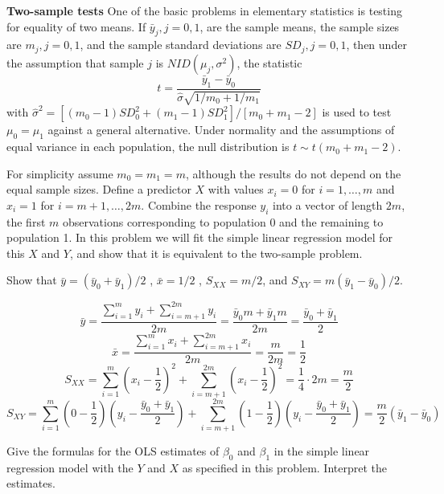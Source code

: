 \documentclass[12pt,oneside,a4paper]{article}\usepackage[]{graphicx}\usepackage[]{xcolor}
\newenvironment{problem}[2][Problem]{\begin{trivlist}
\item[\hskip \labelsep {\bfseries #1}\hskip \labelsep {\bfseries #2.}]}{\end{trivlist}}
\begin{document}
\begin{problem}{2.10}
\textbf{Two-sample tests} One of the basic problems in elementary statistics is testing for equality of two means. If $\bar{y}_{j}, j = 0,1$, are the sample means, the sample sizes are $m_{j} , j = 0, 1$, and the sample standard deviations are $SD_{j}, j  =  0, 1$, then under the assumption that sample $j$ is $NID(\mu_{j}, \sigma^{2})$, the statistic 
$$t =\frac{\bar{y}_{1} - \bar{y}_{0}}{\hat{\sigma}\sqrt{1/m_{0} + 1/m_{1}} }$$
with $\hat{\sigma}^{2} = [( m_{0} - 1 ) SD_{0}^{2} + ( m_{1} - 1 ) SD_{1}^{2} ] / [ m_0 + m_1 - 2 ]$ is used to test $\mu_{0} = \mu_{1}$ against a general alternative. Under normality and the assumptions of equal variance in each population, the null distribution is $t \sim t(m_{0}+m_{1}-2)$.

For simplicity assume $m_{0} = m_{1} = m$, although the results do not depend on the equal sample sizes. Define a predictor $X$ with values $x_{i} = 0$ for $i = 1,\dots,m$ and $x_{i} = 1$ for $i = m+1,\dots,2m$. Combine the response $y_{i}$ into a vector of length $2m$, the first $m$ observations corresponding to population 0 and the remaining to population 1. In this problem we will fit the simple linear regression model for this $X$ and $Y$, and show that it is equivalent to the two-sample problem.
\end{problem}

\begin{problem}{2.10.1}
Show that $\bar{y} = ( \bar{y}_{0} + \bar{y}_{1} ) / 2$ , $\bar{x} = 1 / 2$ , $S_{XX}  =  m/2$, and $S_{XY} = m ( \bar{y}_1-\bar{y}_0 ) / 2$.
\end{problem}

$$\bar{y} = \frac{\sum_{i = 1}^{m}{y_{i}} + \sum_{i=m+1}^{2m}{y_{i}}}{2m} = \frac{\bar{y}_{0}m + \bar{y}_{1}m}{2m} = \frac{\bar{y}_{0} + \bar{y}_{1}}{2}$$
$$\bar{x} = \frac{\sum_{i = 1}^{m}{x_{i}} + \sum_{i=m+1}^{2m}{x_{i}}}{2m} = \frac{m}{2m} = \frac{1}{2}$$
$$S_{XX} = \sum_{i = 1}^{m}{(x_{i} - \frac{1}{2})^2} + \sum_{i=m+1}^{2m}{(x_{i} - \frac{1}{2})^2} = \frac{1}{4}\cdot 2m = \frac{m}{2}$$
$$S_{XY} = \sum_{i = 1}^{m}{(0 - \frac{1}{2})(y_{i} - \frac{\bar{y}_{0} + \bar{y}_{1}}{2})} + \sum_{i=m+1}^{2m}{(1 - \frac{1}{2})(y_{i} - \frac{\bar{y}_{0} + \bar{y}_{1}}{2})} = \frac{m}{2}(\bar{y}_{1} - \bar{y}_{0})$$

\begin{problem}{2.10.2}
Give the formulas for the OLS estimates of $\beta_{0}$ and $\beta_{1}$ in the simple linear regression model with the $Y$ and $X$ as specified in this problem. Interpret the estimates.
\end{problem}
\end{document}
